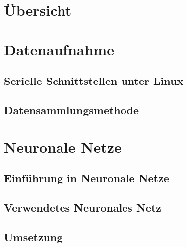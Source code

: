 \chapter{Übersicht}

\chapter{Datenaufnahme}
\section{Serielle Schnittstellen unter Linux}
\section{Datensammlungsmethode}

\chapter{Neuronale Netze}
\section{Einführung in Neuronale Netze}
\section{Verwendetes Neuronales Netz}
\section{Umsetzung}